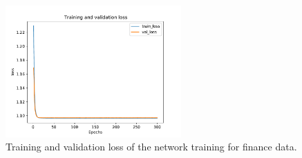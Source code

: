 \begin{figure}
	\centering
	\includegraphics[width=0.6\textwidth]{fig/loss_finance.pdf}
	\caption{Training and validation loss of the network training for finance data.}
	\label{fig:finance_training}
\end{figure}

